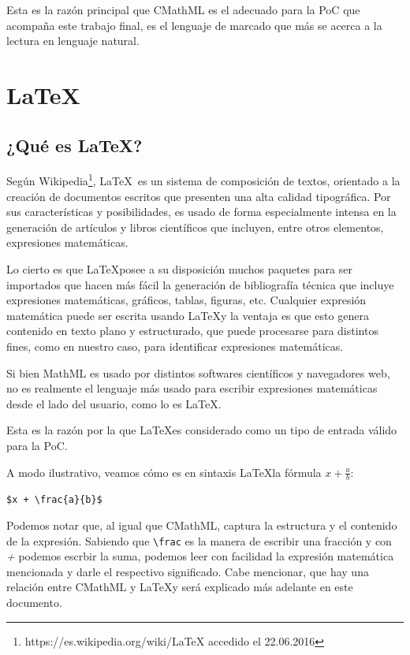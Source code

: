 Esta es la razón principal que CMathML es el adecuado para la PoC que acompaña este trabajo final, es el lenguaje de marcado
que más se acerca a la lectura en lenguaje natural.

\section{\LaTeX}

\subsection{¿Qué es \LaTeX ?}

Según Wikipedia\footnote{https://es.wikipedia.org/wiki/LaTeX accedido el 22.06.2016}, \LaTeX\ es un sistema de composición de textos, orientado a la creación de documentos escritos que
presenten una alta calidad tipográfica. Por sus características y posibilidades, es usado de forma especialmente intensa en la
generación de artículos y libros científicos que incluyen, entre otros elementos, expresiones matemáticas.

Lo cierto es que \LaTeX posee a su disposición muchos paquetes para ser importados que hacen más fácil la generación de bibliografía técnica que incluye expresiones matemáticas, gráficos, tablas, figuras, etc.
 Cualquier expresión matemática puede ser escrita usando \LaTeX y la ventaja es que esto genera contenido en texto plano y estructurado, que puede procesarse para distintos fines, como en nuestro caso, para identificar expresiones matemáticas.

Si bien MathML es usado por distintos softwares científicos y navegadores web, no es realmente el lenguaje más usado para escribir expresiones matemáticas desde
el lado del usuario, como lo es \LaTeX.

Esta es la razón por la que \LaTeX es considerado como un tipo de entrada válido para la PoC.

A modo ilustrativo, veamos cómo es en sintaxis \LaTeX la fórmula $x + \frac{a}{b}$:

\verb|$x + \frac{a}{b}$|

Podemos notar que, al igual que CMathML, captura la estructura y el contenido de la expresión. Sabiendo que \verb|\frac| es la manera de escribir una fracción y con \textit{+} podemos escrbir la suma, podemos leer con facilidad la expresión matemática mencionada y darle el respectivo significado. Cabe mencionar, que hay una relación entre CMathML y \LaTeX y será explicado más adelante en este documento.

